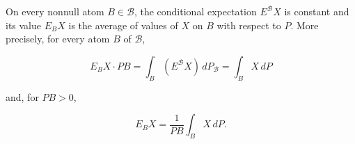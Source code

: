 On every nonnull atom $B \in \mathcal{B}$, the conditional expectation $E^{\mathcal{B}}X$ is constant and its value $E_B X$ is the average of values of $X$ on $B$ with respect to $P$. More precisely, for every atom $B$ of $\mathcal{B}$,

$$
E_B X \cdot P B = \int_B (E^{\mathcal{B}}X) \, dP_{\mathcal{B}} = \int_B X \, dP
$$

and, for $P B > 0$,

$$
E_B X = \frac{1}{P B} \int_B X \, dP.
$$
